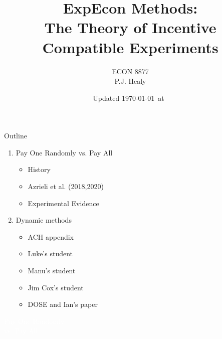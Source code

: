 

\title[Incentives in Experiments: Theory]{ExpEcon Methods:\\The Theory of Incentive Compatible Experiments}
\author[ECON 8877]{ECON 8877\\P.J. Healy} \color{metrop}
\institute[OSU]{}
\date[]{\vfill {\tiny Updated \today\ at\ \DTMcurrenttime}}



\frame{\maketitle}

\begin{frame}{Outline}
\begin{enumerate}
    \item Pay One Randomly vs. Pay All
    \begin{itemize}
        \item History
        \item Azrieli et al. (2018,2020)
        \item Experimental Evidence
    \end{itemize}
    \item Dynamic methods
    \begin{itemize}
        \item ACH appendix
        \item Luke's student
        \item Manu's student
        \item Jim Cox's student
        \item DOSE and Ian's paper
    \end{itemize}
\end{enumerate}
\end{frame}

\begin{transitionframe}[c]
  \begin{center}{ \Huge \textcolor{white}{Pay One Randomly\\vs. Pay All}}\end{center}
\end{transitionframe}

